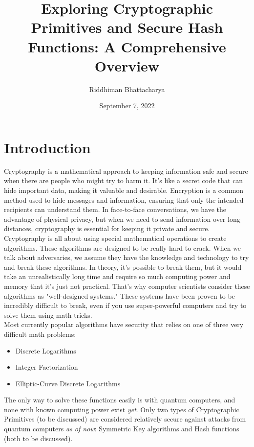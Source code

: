 \documentclass[12pt]{extarticle}
\title{\Huge \textbf{Exploring Cryptographic Primitives and Secure Hash Functions: A Comprehensive Overview}}
\author{\Large Riddhiman Bhattacharya}
\date{September 7, 2022}
\begin{document}
\begin{titlepage}
\maketitle
\end{titlepage}

\section{Introduction}
Cryptography is a mathematical approach to keeping information safe and secure when there are people who might try to harm it. It's like a secret code that can hide important data, making it valuable and desirable. Encryption is a common method used to hide messages and information, ensuring that only the intended recipients can understand them. In face-to-face conversations, we have the advantage of physical privacy, but when we need to send information over long distances, cryptography is essential for keeping it private and secure.\\

Cryptography is all about using special mathematical operations to create algorithms. These algorithms are designed to be really hard to crack. When we talk about adversaries, we assume they have the knowledge and technology to try and break these algorithms. In theory, it's possible to break them, but it would take an unrealistically long time and require so much computing power and memory that it's just not practical. That's why computer scientists consider these algorithms as "well-designed systems." These systems have been proven to be incredibly difficult to break, even if you use super-powerful computers and try to solve them using math tricks.\cite{src2}\cite{src3}\\

Most currently popular algorithms have security that relies on one of three very difficult math problems:

\begin{itemize}
  \item Discrete Logarithms
  \item Integer Factorization
  \item Elliptic-Curve Discrete Logarithms
\end{itemize}

The only way to solve these functions easily is with quantum computers, and none with known computing power exist \textit{yet}. Only two types of Cryptographic Primitives (to be discussed) are considered relatively secure against attacks from quantum computers \textit{as of now}: Symmetric Key algorithms and Hash functions (both to be discussed).\cite{src2}\cite{src4}\cite{src6}\\
\end{document}
